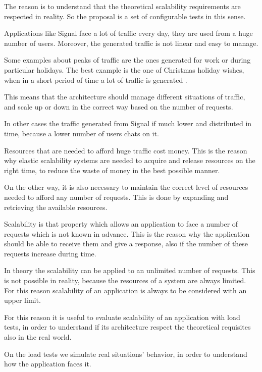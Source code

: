 The reason is to understand that the theoretical scalability requirements are respected in reality. So the proposal is a set of configurable tests in this sense.

Applications like Signal face a lot of traffic every day, they are used from a huge number of users.
Moreover, the generated traffic is not linear and easy to manage.

Some examples about peaks of traffic are the ones generated for work or during particular holidays.
The best example is the one of Christmas holiday wishes, when in a short period of time a lot of traffic is generated \parencite{gunawi2016does}.

This means that the architecture should manage different situations of traffic, and scale up or down in the correct way based on the number of requests.

In other cases the traffic generated from Signal if much lower and distributed in time, because a lower number of users chats on it.

Resources that are needed to afford huge traffic cost money. This is the reason why elastic scalability systems are needed to acquire and release resources on the right time, to reduce the waste of money in the best possible manner.

On the other way, it is also necessary to maintain the correct level of resources needed to afford any number of requests.
This is done by expanding and retrieving the available resources.

Scalability is that property which allows an application to face a number of requests which is not known in advance.
This is the reason why the application should be able to receive them and give a response, also if the number of these requests increase during time.

\clearpage

In theory the scalability can be applied to an unlimited number of requests. This is not possible in reality, because the resources of a system are always limited.
For this reason scalability of an application is always to be considered with an upper limit.

For this reason it is useful to evaluate scalability of an application with load tests, in order to understand if its architecture respect the theoretical requisites also in the real world.

On the load tests we simulate real situations' behavior, in order to understand how the application faces it.

